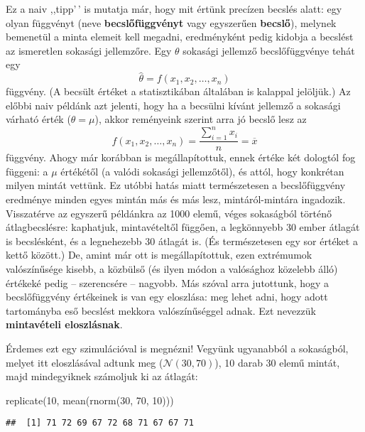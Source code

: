 \documentclass[
]{book}
\newenvironment{Shaded}{\begin{snugshade}}{\end{snugshade}}
\newcommand{\DecValTok}[1]{\textcolor[rgb]{0.00,0.00,0.81}{#1}}
\newcommand{\FunctionTok}[1]{\textcolor[rgb]{0.00,0.00,0.00}{#1}}
\newcommand{\NormalTok}[1]{#1}
\begin{document}
Ez a naiv ,,tipp'\,' is mutatja már, hogy mit értünk precízen becslés alatt: egy olyan függvényt (neve \textbf{becslőfüggvényt} vagy egyszerűen \textbf{becslő}), melynek bemenetül a minta elemeit kell megadni, eredményként pedig kidobja a becslést az ismeretlen sokasági jellemzőre. Egy \(\theta\) sokasági jellemző becslőfüggvénye tehát egy
\[
    \widehat{\theta} = f\left(x_1,x_2,\ldots,x_n\right)
\]
függvény. (A becsült értéket a statisztikában általában is kalappal jelöljük.) Az előbbi naiv példánk azt jelenti, hogy ha a becsülni kívánt jellemző a sokasági várható érték (\(\theta=\mu\)), akkor reményeink szerint arra jó becslő lesz az
\[
    f\left(x_1,x_2,\ldots,x_n\right)=\frac{\sum_{i=1}^n x_i}{n}=\overline{x}
\]
függvény. Ahogy már korábban is megállapítottuk, ennek értéke két dologtól fog függeni: a \(\mu\) értékétől (a valódi sokasági jellemzőtől), és attól, hogy konkrétan milyen mintát vettünk. Ez utóbbi hatás miatt természetesen a becslőfüggvény eredménye minden egyes mintán más és más lesz, mintáról-mintára ingadozik. Visszatérve az egyszerű példánkra az 1000 elemű, véges sokaságból történő átlagbecslésre: kaphatjuk, mintavételtől függően, a legkönnyebb 30 ember átlagát is becslésként, és a legnehezebb 30 átlagát is. (És természetesen egy sor értéket a kettő között.) De, amint már ott is megállapítottuk, ezen extrémumok valószínűsége kisebb, a közbülső (és ilyen módon a valósághoz közelebb álló) értékeké pedig -- szerencsére -- nagyobb. Más szóval arra jutottunk, hogy a becslőfüggvény értékeinek is van egy eloszlása: meg lehet adni, hogy adott tartományba eső becslést mekkora valószínűséggel adnak. Ezt nevezzük \textbf{mintavételi eloszlásnak}.

Érdemes ezt egy szimulációval is megnézni! Vegyünk ugyanabból a sokaságból, melyet itt eloszlásával adtunk meg (\(\mathcal{N}\left(30,70\right)\)), 10 darab 30 elemű mintát, majd mindegyiknek számoljuk ki az átlagát:

\begin{Shaded}
\begin{Highlighting}[]
\FunctionTok{replicate}\NormalTok{(}\DecValTok{10}\NormalTok{, }\FunctionTok{mean}\NormalTok{(}\FunctionTok{rnorm}\NormalTok{(}\DecValTok{30}\NormalTok{, }\DecValTok{70}\NormalTok{, }\DecValTok{10}\NormalTok{)))}
\end{Highlighting}
\end{Shaded}

\begin{verbatim}
##  [1] 71 72 69 67 72 68 71 67 67 71
\end{verbatim}
\end{document}
